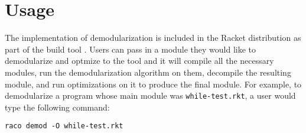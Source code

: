 \section{Usage}
The implementation of demodularization is included in the Racket distribution as part of the build tool . 
Users can pass in a module they would like to demodularize and optmize to the tool and it will compile all the necessary modules, run the demodularization algorithm on them, decompile the resulting module, and run optimizations on it to produce the final module.
For example, to demodularize a program whose main module was \texttt{while-test.rkt}, a user would type the following command: 

\begin{verbatim}
raco demod -O while-test.rkt
\end{verbatim}

